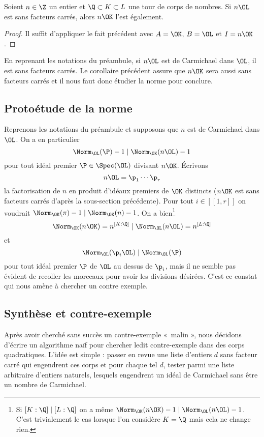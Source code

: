 \documentclass[a4paper, 12pt, oneside]{article}
\begin{document}
\begin{corollaire}Soient $n\in \Z$ un entier et $\Q\subset K\subset L$ une tour de corps de nombres. Si $n\OL$ est sans facteurs carrés, alors $n\OK$ l'est également.
\end{corollaire}

\begin{proof}Il suffit d'appliquer le fait précédent avec $A=\OK$, $B=\OL$ et $I = n\OK$.
\end{proof}

En reprenant les notations du préambule, si $n\OL$ est de Carmichael dans $\OL$, il est sans facteurs carrés. Le corollaire précédent assure que $n\OK$ sera aussi sans facteurs carrés et il nous faut donc étudier la norme pour conclure.

\subsection{Protoétude de la norme}

Reprenons les notations du préambule et supposons que $n$ est de Carmichael dans $\OL$. On a en particulier $$\Norm_\OL(\P) - 1 \mid \Norm_\OK(n\OL) - 1$$ pour tout idéal premier $\P\in \Spec(\OL)$ divisant $n\OK$. Écrivons $$n\OL = \p_1\cdots \p_r$$ la factorisation de $n$ en produit d'idéaux premiers de $\OK$ distincts ($n\OK$ est sans facteurs carrés d'après la sous-section précédente). Pour tout $i\in [\![1, r]\!]$ on voudrait $\Norm_\OK(\pi) - 1\mid \Norm_\OK(n) - 1$. On a bien\footnote{Si $[K : \Q]\mid [L:\Q]$ on a même $\Norm_\OK(n\OK) - 1\mid \Norm_\OL(n\OL) - 1$. C'est trivialement le cas lorsque l'on considère $K=\Q$ mais cela ne change rien.} $$\Norm_\OK(n\OK) = n^{[K : \Q]} \mid \Norm_\OL(n\OL) = n^{[L : \Q]}$$ et $$\Norm_\OL(\p_i \OL) \mid \Norm_\OL(\P)$$ pour tout idéal premier $\P$ de $\OL$ au dessus de $\p_i$, mais il ne semble pas évident de recoller les morceaux pour avoir les divisions désirées. C'est ce constat qui nous amène à chercher un contre exemple.


\subsection{Synthèse et contre-exemple}

Après avoir cherché sans succès un contre-exemple « malin », nous décidons d'écrire un algorithme naïf pour chercher ledit contre-exemple dans des corps quadratiques. L'idée est simple : passer en revue une liste d'entiers $d$ sans facteur carré qui engendrent ces corps et pour chaque tel $d$, tester parmi une liste arbitraire d'entiers naturels, lesquels engendrent un idéal de Carmichael sans être un nombre de Carmichael. \\
\end{document}
